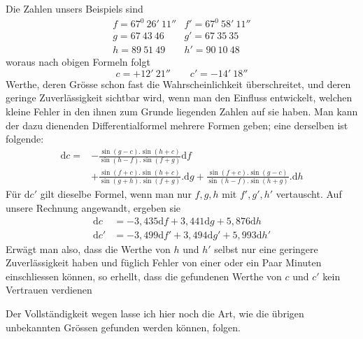 Die Zahlen unsers Beispiels sind
\[
\begin{array}{ll}
f=67^0\ 26'\ 11''&f'=67^0\ 58'\ 11''\\
g=67\ 43\ 46&g'=67\ 35\ 35\\
h=89\ 51\ 49&h'=90\ 10\ 48
\end{array}
\]
woraus nach obigen Formeln folgt
\[
c=+12'\ 21''\qquad c'=-14'\ 18''
\]
Werthe, deren Grösse schon fast die Wahrscheinlichkeit überschreitet, und deren geringe Zuverlässigkeit sichtbar wird, wenn man den Einfluss entwickelt, welchen kleine Fehler in den ihnen zum Grunde liegenden Zahlen auf sie haben. Man kann der dazu dienenden Differentialformel mehrere Formen geben; eine derselben ist folgende:
\[
\begin{aligned}
\mathrm{d}c={}&-\frac{\sin(g-c).\sin(h+c)}{\sin(h-f).\sin(f+g)}\mathrm{d}f\\
&+\frac{\sin(f+c).\sin(h+c)}{\sin(g+h).\sin(f+g)}.\mathrm{d}g
+\frac{\sin(f+c).\sin(g-c)}{\sin(h-f).\sin(h+g)}.\mathrm{d}h
\end{aligned}
\]
Für $\mathrm{d}c'$ gilt dieselbe Formel, wenn man nur $f,g,h$ mit $f',g',h'$ vertauscht. Auf unsere Rechnung angewandt, ergeben sie
\[
\begin{aligned}
\mathrm{d}c&=-3{,}435\mathrm{d}f+3{,}441\mathrm{d}g+5{,}876\mathrm{d}h\\
\mathrm{d}c'&=-3{,}499\mathrm{d}f'+3{,}494\mathrm{d}g'+5{,}993\mathrm{d}h'
\end{aligned}
\]
Erwägt man also, dass die Werthe von $h$ und $h'$ selbst nur eine geringere Zuverlässigkeit haben und füglich Fehler von einer oder ein Paar Minuten einschliessen können, so erhellt, dass die gefundenen Werthe von $c$ und $c'$ kein Vertrauen verdienen

Der Vollständigkeit wegen lasse ich hier noch die Art, wie die übrigen unbekannten Grössen gefunden werden können, folgen.

